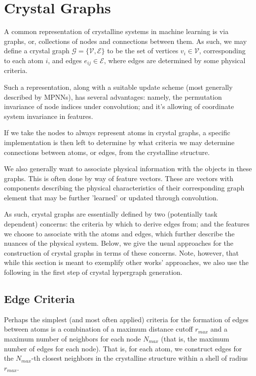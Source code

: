 \documentclass[10pt,a4paper]{article}
\begin{document}
\section{Crystal Graphs}
A common representation of crystalline systems in machine learning is via graphs, or, collections of nodes and connections between them. As such, we may define a crystal graph $\mathcal{G}=\lbrace \mathcal{V},\mathcal{E}\rbrace$ to be the set of vertices $v_i\in\mathcal{V}$, corresponding to each atom $i$, and edges $e_{ij}\in\mathcal{E}$, where edges are determined by some physical criteria.

Such a representation, along with a suitable update scheme (most generally described by MPNNs), has several advantages: namely, the permutation invariance of node indices under convolution; and it's allowing of coordinate system invariance in features.

If we take the nodes to always represent atoms in crystal graphs, a specific implementation is then left to determine by what criteria we may determine connections between atoms, or edges, from the crystalline structure. 

We also generally want to associate physical information with the objects in these graphs. This is often done by way of feature vectors. These are vectors with components describing the physical characteristics of their corresponding graph element that may be further 'learned' or updated through convolution.

As such, crystal graphs are essentially defined by two (potentially task dependent) concerns: the criteria by which to derive edges from; and the features we choose to associate with the atoms and edges, which further describe the nuances of the physical system. Below, we give the usual approaches for the construction of crystal graphs in terms of these concerns. Note, however, that while this section is meant to exemplify other works' approaches, we also use the following in the first step of crystal hypergraph generation.

\subsection{Edge Criteria}
Perhaps the simplest (and most often applied) criteria for the formation of edges between atoms is a combination of a maximum distance cutoff $r_{max}$ and a maximum number of neighbors for each node $N_{max}$ (that is, the maximum number of edges for each node). That is, for each atom, we construct edges for the $N_{max}$-th closest neighbors in the crystalline structure within a shell of radius $r_{max}$.
\end{document}
